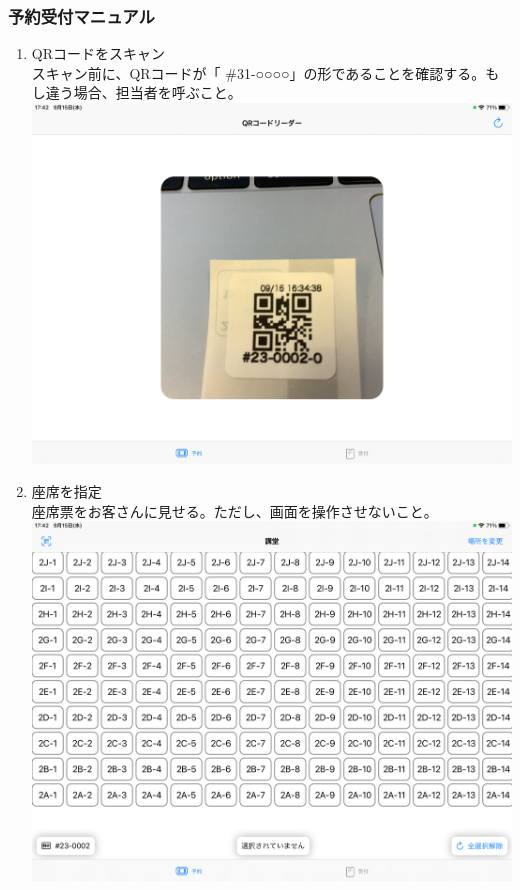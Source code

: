 \documentclass[dvipdfmx,jb5]{jarticle}
\begin{document}
 \subsubsection{予約受付マニュアル}
 \begin{enumerate}
  \item QRコードをスキャン\\
  スキャン前に、QRコードが「 \#31-○○○○」の形であることを確認する。もし違う場合、担当者を呼ぶこと。\\
  \includegraphics[scale=0.2]{assets/auditorium-seat-reservation-system_QR.png}
  \item 座席を指定\\
  座席票をお客さんに見せる。ただし、画面を操作させないこと。\\
  \includegraphics[scale=0.2]{assets/auditorium-seat-reservation-system_select-seat.png}\\

\end{enumerate}
\end{document}
